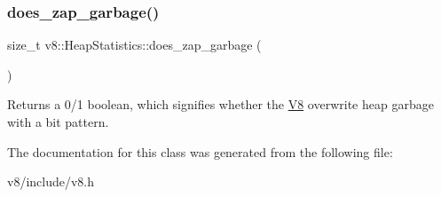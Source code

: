 \subsubsection{\texorpdfstring{does\+\_\+zap\+\_\+garbage()}{does\_zap\_garbage()}}
{\footnotesize\ttfamily size\+\_\+t v8\+::\+Heap\+Statistics\+::does\+\_\+zap\+\_\+garbage (\begin{DoxyParamCaption}{ }\end{DoxyParamCaption})\hspace{0.3cm}{\ttfamily [inline]}}

Returns a 0/1 boolean, which signifies whether the \mbox{\hyperlink{classv8_1_1V8}{V8}} overwrite heap garbage with a bit pattern. 

The documentation for this class was generated from the following file\+:\begin{DoxyCompactItemize}
\item 
v8/include/v8.\+h\end{DoxyCompactItemize}

